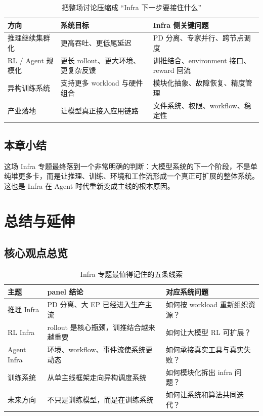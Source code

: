 \documentclass[a4paper]{article}
\begin{document}
\begin{table}[H]
\centering
\begin{tabular}{p{2.8cm}p{4.2cm}p{4.4cm}}
\toprule
\textbf{方向} & \textbf{系统目标} & \textbf{Infra 侧关键问题} \\
\midrule
推理继续集群化 & 更高吞吐、更低尾延迟 & PD 分离、专家并行、跨节点调度 \\
RL / Agent 规模化 & 更长 rollout、更大环境、更复杂反馈 & 训推结合、environment 接口、reward 回流 \\
异构训练系统 & 支持更多 workload 与硬件组合 & 模块化抽象、故障恢复、精度管理 \\
产业落地 & 让模型真正接入应用链路 & 文件系统、权限、workflow、稳定性 \\
\bottomrule
\end{tabular}
\caption{把整场讨论压缩成 ``Infra 下一步要接住什么''}
\end{table}

\subsection{本章小结}
这场 Infra 专题最终落到一个非常明确的判断：大模型系统的下一个阶段，不是单纯堆更多卡，而是让推理、训练、环境和工作流形成一个真正可扩展的整体系统。这也是 Infra 在 Agent 时代重新变成主线的根本原因。

\section{总结与延伸}

\subsection{核心观点总览}
\begin{table}[H]
\centering
\begin{tabular}{p{2.8cm}p{4.0cm}p{5.0cm}}
\toprule
\textbf{主题} & \textbf{panel 结论} & \textbf{对应系统问题} \\
\midrule
推理 Infra & PD 分离、大 EP 已经进入生产主流 & 如何按 workload 重新组织资源？ \\
RL Infra & rollout 是核心瓶颈，训推结合越来越重要 & 如何让大模型 RL 可扩展？ \\
Agent Infra & 环境、workflow、事件流使系统更动态 & 如何承接真实工具与真实失败？ \\
训练系统 & 从单主线框架走向异构调度系统 & 如何模块化拆出 infra 问题？ \\
未来方向 & 不只是训练模型，而是在训练系统 & 如何让系统和算法共同迭代？ \\
\bottomrule
\end{tabular}
\caption{Infra 专题最值得记住的五条线索}
\end{table}
\end{document}

